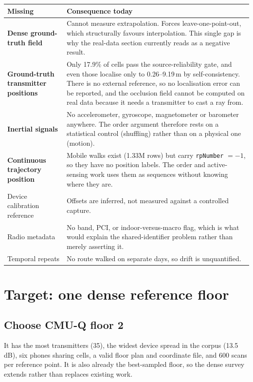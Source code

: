 \documentclass[10pt,a4paper]{article}
\newcommand{\B}[1]{\textcolor{bad}{\textbf{#1}}}
\begin{document}
\begin{center}\small
\begin{tabular}{@{}p{4.2cm}p{12.6cm}@{}}
\toprule
Missing & Consequence today \\ \midrule
\B{Dense ground-truth field} & Cannot measure extrapolation. Forces leave-one-point-out,
which structurally favours interpolation. This single gap is why the real-data section
currently reads as a negative result. \\
\B{Ground-truth transmitter positions} & Only 17.9\% of cells pass the source-reliability
gate, and even those localise only to 0.26--9.19\,m by self-consistency. There is no
external reference, so no localisation error can be reported, and the occlusion field
cannot be computed on real data because it needs a transmitter to cast a ray from. \\
\B{Inertial signals} & No accelerometer, gyroscope, magnetometer or barometer anywhere.
The order argument therefore rests on a statistical control (shuffling) rather than on a
physical one (motion). \\
\B{Continuous trajectory position} & Mobile walks exist (1.33M rows) but carry
\texttt{rpNumber} $=-1$, so they have no position labels. The order and active-sensing
work uses them as sequences without knowing where they are. \\
Device calibration reference & Offsets are inferred, not measured against a controlled
capture. \\
Radio metadata & No band, PCI, or indoor-versus-macro flag, which is what would explain
the shared-identifier problem rather than merely asserting it. \\
Temporal repeats & No route walked on separate days, so drift is unquantified. \\
\bottomrule
\end{tabular}
\end{center}

\section{Target: one dense reference floor}

\subsection{Choose CMU-Q floor 2}

It has the most transmitters (35), the widest device spread in the corpus (13.5\,dB),
six phones sharing cells, a valid floor plan and coordinate file, and 600 scans per
reference point. It is also already the best-sampled floor, so the dense survey extends
rather than replaces existing work.
\end{document}
